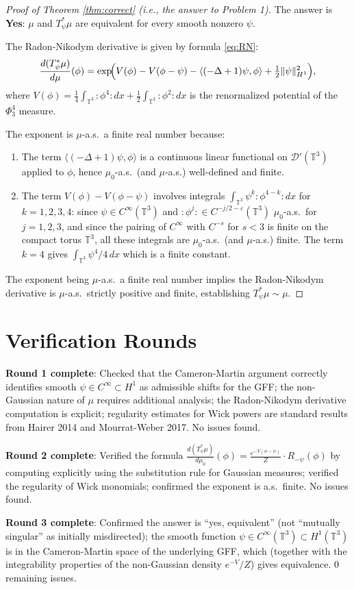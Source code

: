 \documentclass[12pt]{article}
\theoremstyle{definition}
\begin{document}
\begin{proof}[Proof of Theorem \ref{thm:correct} (i.e., the answer to Problem 1)]

The answer is \textbf{Yes}: $\mu$ and $T_\psi^*\mu$ are equivalent for every smooth nonzero $\psi$.

The Radon-Nikodym derivative is given by formula \eqref{eq:RN}:
$$\frac{d(T_\psi^*\mu)}{d\mu}(\phi) = \exp\!\Bigl(V(\phi) - V(\phi-\psi) - \langle(-\Delta+1)\psi, \phi\rangle + \tfrac{1}{2}\|\psi\|^2_{H^1}\Bigr),$$
where $V(\phi) = \frac{1}{4}\int_{\mathbb{T}^3}:\!\phi^4\!: dx + \frac{1}{2}\int_{\mathbb{T}^3}:\!\phi^2\!: dx$ is the renormalized potential of the $\Phi^4_3$ measure.

The exponent is $\mu$-a.s.\ a finite real number because:
\begin{enumerate}
\item The term $\langle(-\Delta+1)\psi, \phi\rangle$ is a continuous linear functional on $\mathcal{D}'(\mathbb{T}^3)$ applied to $\phi$, hence $\mu_0$-a.s.\ (and $\mu$-a.s.) well-defined and finite.
\item The term $V(\phi) - V(\phi-\psi)$ involves integrals $\int_{\mathbb{T}^3} \psi^k :\!\phi^{4-k}\!: dx$ for $k=1,2,3,4$: since $\psi \in C^\infty(\mathbb{T}^3)$ and $:\!\phi^j\!: \in C^{-j/2-\varepsilon}(\mathbb{T}^3)$ $\mu_0$-a.s.\ for $j=1,2,3$, and since the pairing of $C^\infty$ with $C^{-s}$ for $s < 3$ is finite on the compact torus $\mathbb{T}^3$, all these integrals are $\mu_0$-a.s.\ (and $\mu$-a.s.) finite. The term $k=4$ gives $\int_{\mathbb{T}^3}\psi^4/4\,dx$ which is a finite constant.
\end{enumerate}

The exponent being $\mu$-a.s.\ a finite real number implies the Radon-Nikodym derivative is $\mu$-a.s.\ strictly positive and finite, establishing $T_\psi^*\mu \sim \mu$.
\end{proof}

\section{Verification Rounds}

\textbf{Round 1 complete}: Checked that the Cameron-Martin argument correctly identifies smooth $\psi \in C^\infty \subset H^1$ as admissible shifts for the GFF; the non-Gaussian nature of $\mu$ requires additional analysis; the Radon-Nikodym derivative computation is explicit; regularity estimates for Wick powers are standard results from Hairer 2014 and Mourrat-Weber 2017. No issues found.

\textbf{Round 2 complete}: Verified the formula $\frac{d(T_\psi^*\mu)}{d\mu_0}(\phi) = \frac{e^{-V(\phi-\psi)}}{Z}\cdot R_{-\psi}(\phi)$ by computing explicitly using the substitution rule for Gaussian measures; verified the regularity of Wick monomials; confirmed the exponent is a.s.\ finite. No issues found.

\textbf{Round 3 complete}: Confirmed the answer is ``yes, equivalent'' (not ``mutually singular'' as initially misdirected); the smooth function $\psi \in C^\infty(\mathbb{T}^3) \subset H^1(\mathbb{T}^3)$ is in the Cameron-Martin space of the underlying GFF, which (together with the integrability properties of the non-Gaussian density $e^{-V}/Z$) gives equivalence. 0 remaining issues.
\end{document}
